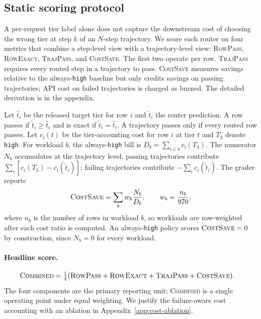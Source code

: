 \subsection{Static scoring protocol}
\label{sec:static-scoring}

A per-request tier label alone does not capture the downstream cost of choosing
the wrong tier at step $k$ of an $N$-step trajectory. We score each router on
four metrics that combine a step-level view with a trajectory-level view:
\textsc{RowPass}, \textsc{RowExact}, \textsc{TrajPass}, and \textsc{CostSave}.
The first two operate per row. \textsc{TrajPass} requires every routed step in
a trajectory to pass. \textsc{CostSave} measures savings relative to the
always-\texttt{high} baseline but only credits savings on passing trajectories;
API cost on failed trajectories is charged as burned. The detailed
derivation is in the appendix.

Let $\hat{t}_i$ be the released target tier for row $i$ and $\tilde{t}_i$ the
router prediction. A row passes if $\tilde{t}_i \ge \hat{t}_i$ and is exact if
$\tilde{t}_i=\hat{t}_i$. A trajectory passes only if every routed row passes.
Let $c_i(t)$ be the tier-accounting cost for row $i$ at tier $t$ and $T_3$
denote \texttt{high}. For workload $b$, the always-\texttt{high} bill is
$D_b=\sum_{i\in b} c_i(T_3)$. The numerator $N_b$ accumulates at the
trajectory level: passing trajectories contribute
$\sum_i[c_i(T_3)-c_i(\tilde{t}_i)]$; failing trajectories contribute
$-\sum_i c_i(\tilde{t}_i)$. The grader reports
\[
\textsc{CostSave} = \sum_b w_b \frac{N_b}{D_b}, \qquad
w_b = \frac{n_b}{970},
\]
where $n_b$ is the number of rows in workload $b$, so workloads are row-weighted after each cost ratio is computed. An
always-\texttt{high} policy scores $\textsc{CostSave}=0$ by construction,
since $N_b=0$ for every workload.

\paragraph{Headline score.}
\[
\begin{aligned}
\textsc{Combined} = \tfrac{1}{4}(&\textsc{RowPass} +
\textsc{RowExact} + \textsc{TrajPass} + \textsc{CostSave}).
\end{aligned}
\]
The four components are the primary reporting unit; \textsc{Combined} is a
single operating point under equal weighting. We justify the failure-aware cost
accounting with an ablation in Appendix~\ref{app:cost-ablation}.

